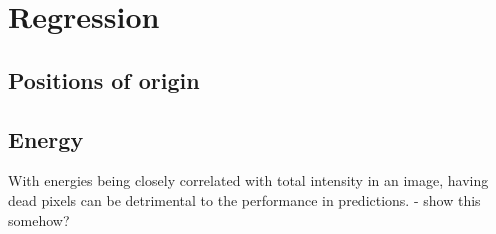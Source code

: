 \section{Regression}
\subsection{Positions of origin}
\subsection{Energy}
With energies being closely correlated with total intensity in an image,
having dead pixels can be detrimental to the performance in predictions.
- show this somehow?